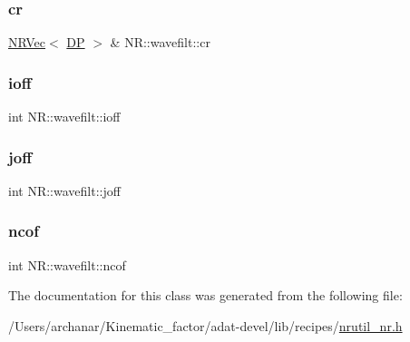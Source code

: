 \subsubsection{\texorpdfstring{cr}{cr}}
{\footnotesize\ttfamily \mbox{\hyperlink{classNR_1_1NRVec}{N\+R\+Vec}}$<$ \mbox{\hyperlink{namespaceNR_af6ff762dd605ff477b8e52387253a02a}{DP}} $>$ \& N\+R\+::wavefilt\+::cr}

\mbox{\label{classNR_1_1wavefilt_acc0fda6a300680212528c1c318a3471a}} 
\subsubsection{\texorpdfstring{ioff}{ioff}}
{\footnotesize\ttfamily int N\+R\+::wavefilt\+::ioff}

\mbox{\label{classNR_1_1wavefilt_ae84da52274e02386b4a0192353ac8553}} 
\subsubsection{\texorpdfstring{joff}{joff}}
{\footnotesize\ttfamily int N\+R\+::wavefilt\+::joff}

\mbox{\label{classNR_1_1wavefilt_ae9ed314d698a843e2bbf723b2463d2e8}} 
\subsubsection{\texorpdfstring{ncof}{ncof}}
{\footnotesize\ttfamily int N\+R\+::wavefilt\+::ncof}



The documentation for this class was generated from the following file\+:\begin{DoxyCompactItemize}
\item 
/\+Users/archanar/\+Kinematic\+\_\+factor/adat-\/devel/lib/recipes/\mbox{\hyperlink{adat-devel_2lib_2recipes_2nrutil__nr_8h}{nrutil\+\_\+nr.\+h}}\end{DoxyCompactItemize}
